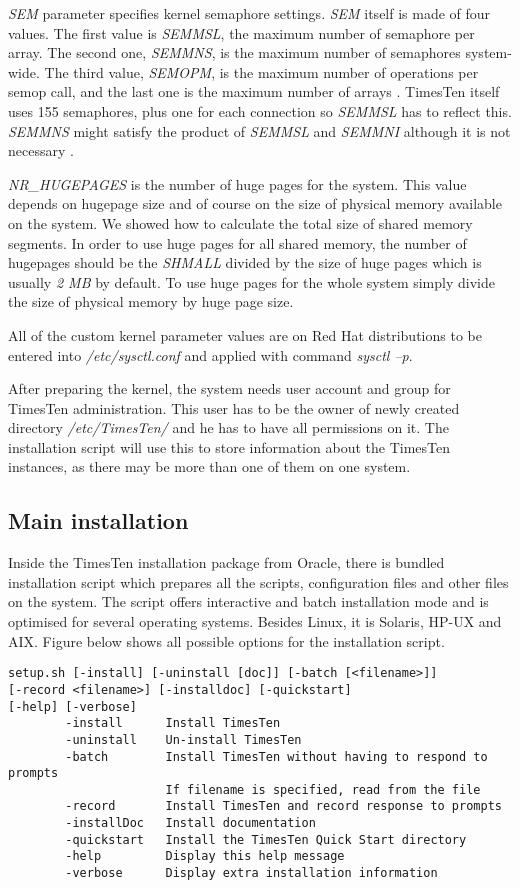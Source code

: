 \documentclass[11pt, letterpaper]{article}
\begin{document}
\emph{SEM} parameter specifies kernel semaphore settings. \emph{SEM} itself is made of four values. The first value is \emph{SEMMSL}, the maximum number of semaphore per array. The second one, \emph{SEMMNS}, is the maximum number of semaphores system-wide. The third value, \emph{SEMOPM}, is the maximum number of operations per semop call, and the last one is the maximum number of arrays \cite{ref_simon}. TimesTen itself uses 155 semaphores, plus one for each connection \cite{ref_semaphore} so \emph{SEMMSL} has to reflect this. \emph{SEMMNS} might satisfy the product of \emph{SEMMSL} and \emph{SEMMNI} although it is not necessary \cite{ref_simon}.

\emph{NR\_HUGEPAGES} is the number of huge pages for the system. This value depends on hugepage size and of course on the size of physical memory available on the system. We showed how to calculate the total size of shared memory segments. In order to use huge pages for all shared memory, the number of hugepages should be the \emph{SHMALL} divided by the size of huge pages which is usually \emph{2 MB} by default. To use huge pages for the whole system simply divide the size of physical memory by huge page size.

All of the custom kernel parameter values are on Red Hat distributions to be entered into \emph{/etc/sysctl.conf} and applied with command \emph{sysctl –p}.

After preparing the kernel, the system needs user account and group for TimesTen administration. This user has to be the owner of newly created directory \emph{/etc/TimesTen/} and he has to have all permissions on it. The installation script will use this to store information about the TimesTen instances, as there may be more than one of them on one system.

\subsection{Main installation}

Inside the TimesTen installation package from Oracle, there is bundled installation script which prepares all the scripts, configuration files and other files on the system. The script offers interactive and batch installation mode and is optimised for several operating systems. Besides Linux, it is Solaris, HP-UX and AIX. Figure below shows all possible options for the installation script.

\lstset{basicstyle=\ttfamily\scriptsize}
\begin{lstlisting}
setup.sh [-install] [-uninstall [doc]] [-batch [<filename>]]
[-record <filename>] [-installdoc] [-quickstart]
[-help] [-verbose]
        -install      Install TimesTen
        -uninstall    Un-install TimesTen
        -batch        Install TimesTen without having to respond to prompts
                      If filename is specified, read from the file
        -record       Install TimesTen and record response to prompts
        -installDoc   Install documentation
        -quickstart   Install the TimesTen Quick Start directory
        -help         Display this help message
        -verbose      Display extra installation information
\end{lstlisting}
\end{document}
